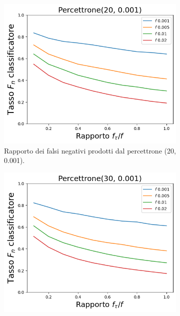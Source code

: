 \documentclass[../../main.tex]{subfiles}
\begin{document}
    \begin{figure}[H]
        \centering
        \begin{subfigure}[b]{0.49\textwidth}
            \centering
            \includegraphics[width = \textwidth]{immagini/7/LBF/Percettrone(20, 0.001)_FNR.png}
            \caption{Rapporto dei falsi negativi prodotti dal percettrone (20, 0.001).}
            \label{fig:LBFFNRPercettrone20}
        \end{subfigure}
        \begin{subfigure}[b]{0.49\textwidth}
            \centering
            \includegraphics[width = \textwidth]{immagini/7/LBF/Percettrone(30, 0.001)_FNR.png}

\end{subfigure}
\end{figure}
\end{document}
